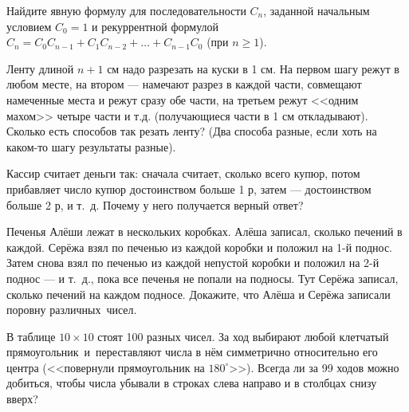 \documentclass[11pt,a4paper]{article}
\begin{document}
Найдите явную формулу для последовательности $C_n$, заданной
начальным условием $C_0=1$
и рекуррентной формулой $C_n=C_0C_{n-1}+C_1C_{n-2}+\ldots+C_{n-1}C_0$
(при $n\geq1$).

Ленту длиной $n+1$ см надо разрезать на куски в 1 см. На первом шагу режут в любом месте, на втором --- намечают разрез в каждой части, совмещают намеченные места и режут сразу обе части, на третьем режут <<одним махом>> четыре части и т.д. (получающиеся части в 1 см откладывают). Сколько есть способов так резать ленту? (Два способа разные, если хоть на каком-то шагу результаты разные).


Кассир считает деньги так: сначала считает, сколько всего купюр, потом прибавляет число купюр достоинством больше 1 р, затем --- достоинством больше 2 р, и т.~д. Почему у него получается верный ответ?

Печенья Алёши лежат в нескольких коробках.
Алёша записал, сколько печений в каждой.
Серёжа взял по печенью из каждой коробки и положил на 1-й поднос.
Затем снова взял по печенью из каждой непустой коробки
и положил на  2-й поднос --- и т.~д., пока все
печенья не попали на подносы. Тут Серёжа
записал, сколько печений на каждом подносе.
Докажите, что Алёша и Серёжа записали поровну различных~чисел.

В таблице $10\times10$ стоят 100 разных чисел. За ход выбирают любой клетчатый прямоугольник~и~переставляют числа в нём симметрично относительно его центра (<<повернули прямоугольник на $180^\circ$>>). Всегда ли за 99 ходов можно добиться, чтобы числа убывали в строках слева направо и в столбцах снизу вверх?


\vspace*{-2mm}

\end{document}

